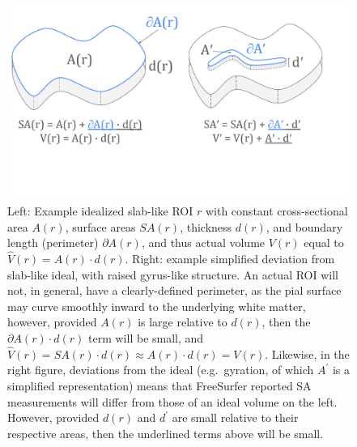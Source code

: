 \documentclass{article}
\newcommand{\note}[2][cyan]{\textbf{NOTE}: \textcolor{#1}{#2}}
\begin{document}


\begin{figure}[H]
	\centering
	\includegraphics[width=5in]{figures/ROI_slabs_strip.pdf}
	\caption{Left: Example idealized slab-like ROI \(r\) with constant
	cross-sectional area \(A(r)\), surface areas \(SA(r)\), thickness \(d(r)\),
	and boundary length (perimeter) \(\partial A(r)\), and thus actual volume
	\(V(r)\) equal to \(\hat{V}(r) = A(r) \cdot d(r)\). Right: example
	simplified deviation from slab-like ideal, with raised gyrus-like
	structure. An actual ROI will not, in general, have a clearly-defined
	perimeter, as the pial surface may curve smoothly inward to the underlying
	white matter, however, provided \(A(r)\) is large relative to \(d(r)\),
	then the \(\partial A(r) \cdot d(r)\) term will be small, and \(\hat{V}(r)
	= SA(r) \cdot d(r) \approx A(r) \cdot d(r) = V(r)\). Likewise, in the right
	figure, deviations from the ideal (e.g.\ gyration, of which \(A^{\prime}\)
	is a simplified representation) means that FreeSurfer reported SA
	measurements will differ from those of an ideal volume on the left.
	However, provided \(d(r)\) and \(d^{\prime}\) are small relative to their
	respective areas, then the underlined terms above will be small.} \label{fig:slab}
\end{figure}
\end{document}

